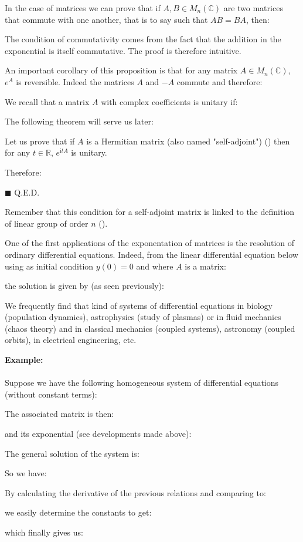 	In the case of matrices we can prove that if $A,B\in M_n(\mathbb{C})$ are two matrices that commute with one another, that is to say such that $AB=BA$, then:
	
	The condition of commutativity comes from the fact that the addition in the exponential is itself commutative. The proof is therefore intuitive.
	
	An important corollary of this proposition is that for any matrix $A\in M_n(\mathbb{C})$, $e^A$ is reversible. Indeed the matrices $A$ and $-A$ commute and therefore:
	
	We recall that a matrix $A$ with complex coefficients is unitary if:
	
	The following theorem will serve us later:
	\begin{theorem}
	Let us prove that if $A$ is a Hermitian matrix (also named "self-adjoint") () then for any $t\in\mathbb{R}$, $e^{\mathrm{i}tA}$ is unitary.
	\end{theorem}
	\begin{dem}
	
	Therefore:
	
	\begin{flushright}
		$\blacksquare$  Q.E.D.
	\end{flushright}
	\end{dem}
	Remember that this condition for a self-adjoint matrix is linked to the definition of linear group of order $n$ ().
	
	One of the first applications of the exponentation of matrices is the resolution of ordinary differential equations. Indeed, from the linear differential equation below using as initial condition $y(0)=0$ and where $A$ is a matrix:
	
	the solution is given by (as seen previously):
	
	We frequently find that kind of systems of differential equations in biology (population dynamics), astrophysics (study of plasmas) or in fluid mechanics (chaos theory) and in classical mechanics (coupled systems), astronomy (coupled orbits), in electrical engineering, etc.
	
	\begin{tcolorbox}[colframe=black,colback=white,sharp corners]
	\textbf{{\Large {}}Example:}\\\\
	Suppose we have the following homogeneous system of differential equations (without constant terms):
	
	The associated matrix is then:
	
	and its exponential (see developments made above):
	
	The general solution of the system is:
	
	So we have:
	
	By calculating the derivative of the previous relations and comparing to:
	
	we easily determine the constants to get:
	
	which finally gives us:
	
	\end{tcolorbox}

